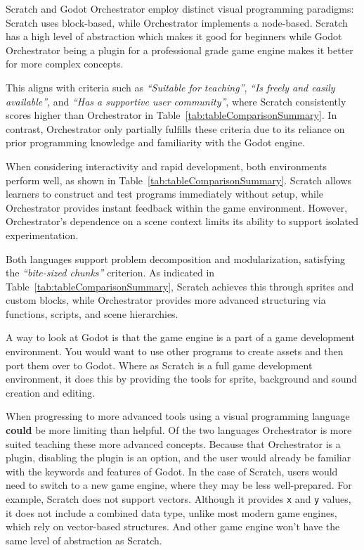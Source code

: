 Scratch and Godot Orchestrator employ distinct visual programming paradigms: Scratch uses block-based, while Orchestrator implements a node-based.
Scratch has a high level of abstraction which makes it good for beginners while Godot Orchestrator being a plugin for a professional grade game engine makes it better for more complex concepts.

This aligns with criteria such as \textit{“Suitable for teaching”}, \textit{“Is freely and easily available”}, and \textit{“Has a supportive user community”}, where Scratch consistently scores higher than Orchestrator in Table~\ref{tab:tableComparisonSummary}.
In contrast, Orchestrator only partially fulfills these criteria due to its reliance on prior programming knowledge and familiarity with the Godot engine.

When considering interactivity and rapid development, both environments perform well, as shown in Table~\ref{tab:tableComparisonSummary}.
Scratch allows learners to construct and test programs immediately without setup, while Orchestrator provides instant feedback within the game environment.
However, Orchestrator’s dependence on a scene context limits its ability to support isolated experimentation.

Both languages support problem decomposition and modularization, satisfying the \textit{“bite-sized chunks”} criterion.
As indicated in Table~\ref{tab:tableComparisonSummary}, Scratch achieves this through sprites and custom blocks, while Orchestrator provides more advanced structuring via functions, scripts, and scene hierarchies.

A way to look at Godot is that the game engine is a part of a game development environment.
You would want to use other programs to create assets and then port them over to Godot.
Where as Scratch is a full game development environment, it does this by providing the tools for sprite, background and sound creation and editing.

When progressing to more advanced tools using a visual programming language \textbf{could} be more limiting than helpful.
Of the two languages Orchestrator is more suited teaching these more advanced concepts.
Because that Orchestrator is a plugin, disabling the plugin is an option, and the user would already be familiar with the keywords and features of Godot.
In the case of Scratch, users would need to switch to a new game engine, where they may be less well-prepared.
For example, Scratch does not support vectors.
Although it provides \texttt{x} and \texttt{y} values, it does not include a combined data type, unlike most modern game engines, which rely on vector-based structures.
And other game engine won’t have the same level of abstraction as Scratch.

